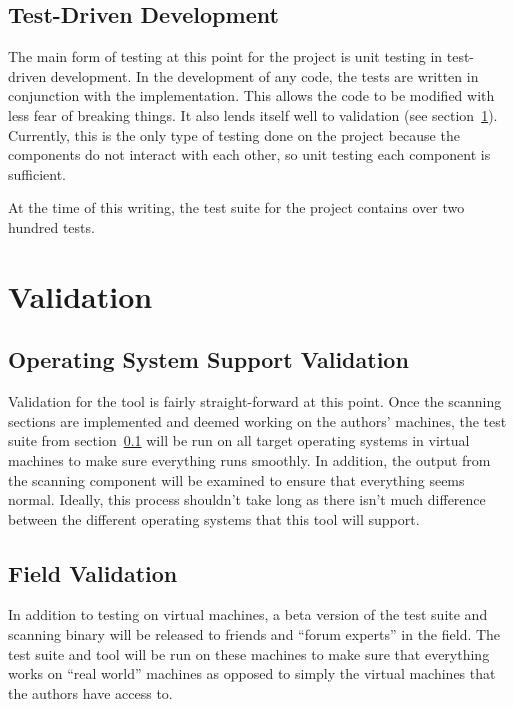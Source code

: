 \documentclass[letterpaper,12pt]{article}
\begin{document}
\subsection{Test-Driven Development} \label{test-driven-development}
The main form of testing at this point for the project is unit testing in
test-driven development.  In the development of any code, the tests are written
in conjunction with the implementation.  This allows the code to be modified
with less fear of breaking things.  It also lends itself well to validation
(see section~\ref{validation}).  Currently, this is the only type of testing
done on the project because the components do not interact with each other, so
unit testing each component is sufficient.

At the time of this writing, the test suite for the project contains over two
hundred tests.

\newpage



\section{Validation} \label{validation}
\subsection{Operating System Support Validation}
Validation for the tool is fairly straight-forward at this point.  Once the
scanning sections are implemented and deemed working on the authors' machines,
the test suite from section~\ref{test-driven-development} will be run on all
target operating systems in virtual machines to make sure everything runs
smoothly.  In addition, the output from the scanning component will be examined
to ensure that everything seems normal.  Ideally, this process shouldn't take
long as there isn't much difference between the different operating systems that
this tool will support.

\subsection{Field Validation}
In addition to testing on virtual machines, a beta version of the test suite and
scanning binary will be released to friends and ``forum experts'' in the field. 
The test suite and tool will be run on these machines to make sure that
everything works on ``real world'' machines as opposed to simply the virtual
machines that the authors have access to.  
\end{document}
